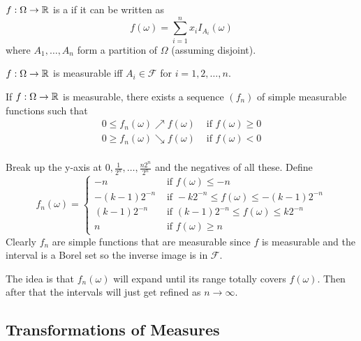 \documentclass[class=article,crop=false]{standalone}
\begin{document}
\begin{defn}
	$ f: \Omega \to \mathbb{R}$ is a  if it can be written as
	\[
		f(\omega)=\sum_{ i= 1}^{ n} x_i I_{A_i}(\omega)
	\] 
	where $ A_1,\ldots,A_n$ form a partition of $ \Omega$ (assuming disjoint).
\end{defn}

\begin{prop}[]
$ f: \Omega \to \mathbb{R}$ is measurable iff $ A_i \in \mathcal{F}$ for $ i=1,2,\ldots,n$.
\end{prop}

\begin{thm}[]
	If $ f: \Omega \to \mathbb{R}$ is measurable, there exists a sequence $ (f_n)$ of simple measurable functions such that 
	\begin{align*}
		0\leq f_n(\omega) \nearrow f(\omega) & \text{ if } f(\omega)\geq 0\\
		0\geq f_n(\omega) \searrow f(\omega) &\text{ if } f(\omega)<0\\ 
	\end{align*}
\end{thm}

\begin{prf}
Break up the y-axis at $ 0,\frac{1}{2^{n}}, \ldots,\frac{n 2^{n}}{2^{n} }$ and the negatives of all these. Define
\begin{equation*}
	f_n(\omega)=
\begin{cases}
	-n &\text{ if } f(\omega)\leq - n\\
	-(k-1)2^{-n} & \text{ if } -k2^{-n}\leq f(\omega) \leq -(k-1)2^{-n} \\
	(k-1)2^{-n} & \text{ if } (k-1)2^{-n} \leq f(\omega) \leq k 2^{-n}\\
	n &  \text{ if } f(\omega)\geq n 
\end{cases}
\end{equation*}
Clearly $ f_n$ are simple functions that are measurable since $ f$ is measurable and the interval is a Borel set so the inverse image is in $ \mathcal{F}$. 
\end{prf}
\begin{intuition}
	The idea is that $ f_n(\omega)$ will expand until its range totally covers $ f(\omega)$. Then after that the intervals will just get refined as $ n \to \infty$. 
\end{intuition}
\subsection*{Transformations of Measures}
\end{document}

